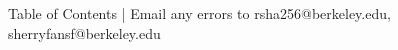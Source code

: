 \documentclass{article}
\begin{document}
\begin{mdframed}[backgroundcolor=blue!20]
Table of Contents | Email any errors to rsha256@berkeley.edu, sherryfansf@berkeley.edu
\end{mdframed}


    \tableofcontents

    
    
    
    
    
    
    
\end{document}
